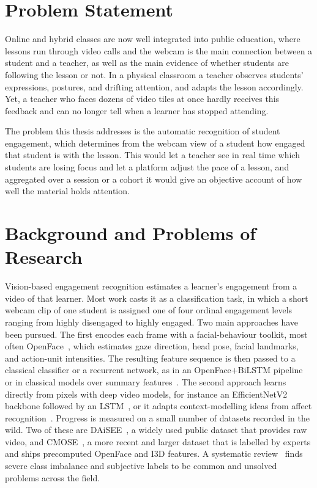 \documentclass[../main.tex]{subfiles}
\begin{document}
\FloatBarrier
\section{Problem Statement}
\label{sec:problem}

Online and hybrid classes are now well integrated into public education, where lessons run through video calls and the webcam is the main connection between a student and a teacher, as well as the main evidence of whether students are following the lesson or not. In a physical classroom a teacher observes students' expressions, postures, and drifting attention, and adapts the lesson accordingly. Yet, a teacher who faces dozens of video tiles at once hardly receives this feedback and can no longer tell when a learner has stopped attending. 

The problem this thesis addresses is the automatic recognition of student engagement, which determines from the webcam view of a student how engaged that student is with the lesson. This would let a teacher see in real time which students are losing focus and let a platform adjust the pace of a lesson, and aggregated over a session or a cohort it would give an objective account of how well the material holds attention.

\FloatBarrier
\section{Background and Problems of Research}
\label{sec:background}

Vision-based engagement recognition estimates a learner's engagement from a video of that learner. Most work casts it as a classification task, in which a short webcam clip of one student is assigned one of four ordinal engagement levels ranging from highly disengaged to highly engaged. Two main approaches have been pursued. The first encodes each frame with a facial-behaviour toolkit, most often OpenFace~\cite{openface2}, which estimates gaze direction, head pose, facial landmarks, and action-unit intensities. The resulting feature sequence is then passed to a classical classifier or a recurrent network, as in an OpenFace$+$BiLSTM pipeline~\cite{openface_bilstm} or in classical models over summary features~\cite{classical_ml_engagement}. The second approach learns directly from pixels with deep video models, for instance an EfficientNetV2 backbone followed by an LSTM~\cite{efficientnet_lstm_engagement}, or it adapts context-modelling ideas from affect recognition~\cite{context_aware_emotion_3d}. Progress is measured on a small number of datasets recorded in the wild. Two of these are DAiSEE~\cite{daisee}, a widely used public dataset that provides raw video, and CMOSE~\cite{cmose}, a more recent and larger dataset that is labelled by experts and ships precomputed OpenFace and I3D features. A systematic review~\cite{review_engagement_cv} finds severe class imbalance and subjective labels to be common and unsolved problems across the field.
\end{document}
